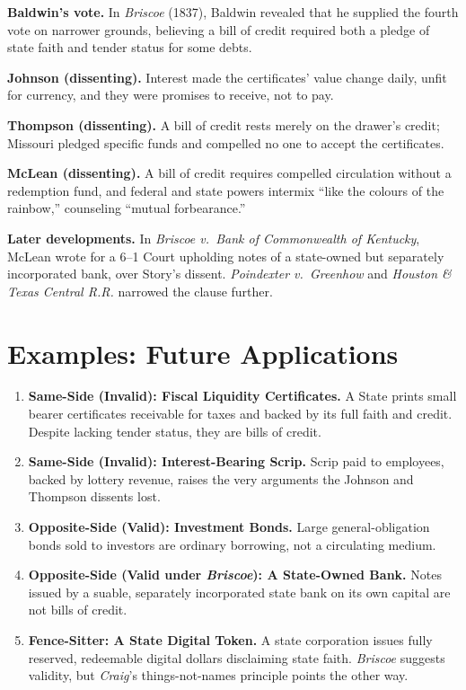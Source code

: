 \documentclass[12pt]{article}
\begin{document}
\textbf{Baldwin's vote.} In \textit{Briscoe} (1837), Baldwin revealed that he supplied the fourth vote on narrower grounds, believing a bill of credit required both a pledge of state faith and tender status for some debts.

\textbf{Johnson (dissenting).} Interest made the certificates' value change daily, unfit for currency, and they were promises to receive, not to pay.

\textbf{Thompson (dissenting).} A bill of credit rests merely on the drawer's credit; Missouri pledged specific funds and compelled no one to accept the certificates.

\textbf{McLean (dissenting).} A bill of credit requires compelled circulation without a redemption fund, and federal and state powers intermix ``like the colours of the rainbow,'' counseling ``mutual forbearance.''

\textbf{Later developments.} In \textit{Briscoe v.\ Bank of Commonwealth of Kentucky}, McLean wrote for a 6--1 Court upholding notes of a state-owned but separately incorporated bank, over Story's dissent. \textit{Poindexter v.\ Greenhow} and \textit{Houston \& Texas Central R.R.} narrowed the clause further.

\section{Examples: Future Applications}

\begin{enumerate}
\item \textbf{Same-Side (Invalid): Fiscal Liquidity Certificates.} A State prints small bearer certificates receivable for taxes and backed by its full faith and credit. Despite lacking tender status, they are bills of credit.
\item \textbf{Same-Side (Invalid): Interest-Bearing Scrip.} Scrip paid to employees, backed by lottery revenue, raises the very arguments the Johnson and Thompson dissents lost.
\item \textbf{Opposite-Side (Valid): Investment Bonds.} Large general-obligation bonds sold to investors are ordinary borrowing, not a circulating medium.
\item \textbf{Opposite-Side (Valid under \textit{Briscoe}): A State-Owned Bank.} Notes issued by a suable, separately incorporated state bank on its own capital are not bills of credit.
\item \textbf{Fence-Sitter: A State Digital Token.} A state corporation issues fully reserved, redeemable digital dollars disclaiming state faith. \textit{Briscoe} suggests validity, but \textit{Craig}'s things-not-names principle points the other way.
\end{enumerate}
\end{document}
